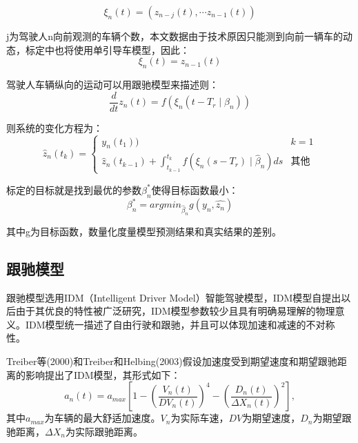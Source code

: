 \begin{equation}
\xi_n(t)=(z_{n-j}(t),\cdots z_{n-1}(t))
\end{equation}

j为驾驶人n向前观测的车辆个数，本文数据由于技术原因只能测到向前一辆车的动态，标定中也将使用单引导车模型，因此：
\begin{equation}
\xi_n(t)=z_{n-1}(t)
\end{equation}

驾驶人车辆纵向的运动可以用跟驰模型来描述则：
\begin{equation}
\frac{d}{dt}z_n(t)=f(\xi_n(t-T_r\mid\beta_n))
\end{equation}

则系统的变化方程为：
\begin{equation}
\hat{z}_n(t_k)=\left\{\begin{matrix}
y_n(t_1))& k=1\\
\hat{z}_n(t_{k-1})+\int_{t_{k-1}}^{t_k} f(\xi_n(s-T_r)\mid\hat{\beta}_n)ds& \text{其他}
\end{matrix}\right.
\end{equation}

标定的目标就是找到最优的参数$\beta^*_n$使得目标函数最小：
\begin{equation}
\beta^*_n=argmin_{\hat{\beta}_n}g(y_n,\hat{z_n})
\end{equation}

其中g为目标函数，数量化度量模型预测结果和真实结果的差别。

\subsection{跟驰模型}

跟驰模型选用IDM（Intelligent Driver Model）智能驾驶模型，IDM模型自提出以后由于其优良的特性被广泛研究，IDM模型参数较少且具有明确易理解的物理意义。IDM模型统一描述了自由行驶和跟驰，并且可以体现加速和减速的不对称性。



Treiber等(2000)\cite{Treiber2000}和Treiber和Helbing(2003)\cite{Treiber2003}假设加速度受到期望速度和期望跟驰距离的影响提出了IDM模型，其形式如下：
\begin{equation}
a_n(t)=a_{max}\left[1-\left(\frac{V_n(t)}{DV_n(t)}\right)^4-\left(\frac{D_n(t)}{\Delta X_n(t)}\right )^2\right],
\end{equation}
其中$a_{max}$为车辆的最大舒适加速度。$V_n$为实际车速，$DV$为期望速度，$D_n$为期望跟驰距离，$\Delta X_n$为实际跟驰距离。


